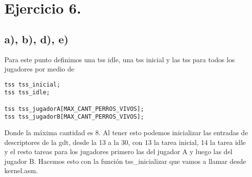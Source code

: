 \section{Ejercicio 6.}

\subsection*{a), b), d), e)}

Para este punto definimos una tss idle, una tss inicial y las tss para todos los jugadores por medio de

\begin{codesnippet}
\begin{verbatim}
tss tss_inicial;
tss tss_idle;

tss tss_jugadorA[MAX_CANT_PERROS_VIVOS];
tss tss_jugadorB[MAX_CANT_PERROS_VIVOS];
\end{verbatim}
\end{codesnippet}

Donde la máxima cantidad es 8. Al tener esto podemos inicializar las entradas de descriptores de la gdt, desde la 13 a la 30, con 13 la tarea inicial, 14 la tarea idle
y el resto tareas para los jugadores primero las del jugador A y luego las del jugador B. Hacemos esto con la función tss\_inicializar que vamos a llamar desde kernel.asm.

